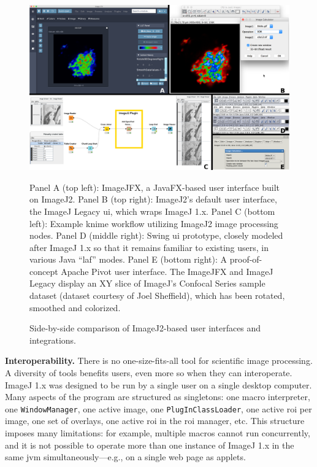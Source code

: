 \documentclass{bmcart}
\begin{document}
  \begin{figure}[h]
    \caption{Side-by-side comparison of ImageJ2-based user interfaces
    and integrations.}
    \includegraphics[width=4.75in,natwidth=2690,natheight=1708]{figure-4/figure-label.png}
    \begin{flushleft}
      \footnotesize
      Panel A (top left): ImageJFX, a JavaFX-based user interface built on
      ImageJ2. Panel B (top right): ImageJ2's default user interface, the
      ImageJ Legacy \acrshort{ui}, which wraps ImageJ 1.x. Panel C (bottom
      left): Example \acrshort{knime} workflow utilizing ImageJ2 image
      processing nodes. Panel D (middle right): Swing \acrshort{ui} prototype,
      closely modeled after ImageJ 1.x so that it remains familiar to existing
      users, in various Java ``\acrlong{laf}'' modes. Panel E (bottom right): A
      proof-of-concept Apache Pivot user interface. The ImageJFX and ImageJ
      Legacy  display an XY slice of ImageJ's Confocal Series
      sample dataset (dataset courtesy of Joel Sheffield), which has been
      rotated, smoothed and colorized.
    \end{flushleft}
  \end{figure}

\textbf{Interoperability.} There is no one-size-fits-all tool for scientific
image processing. A diversity of tools benefits users, even more so when they
can interoperate. ImageJ 1.x was designed to be run by a single user on a
single desktop computer. Many aspects of the program are structured as
singletons: one macro interpreter, one \texttt{WindowManager}, one active
image, one \texttt{PlugInClassLoader}, one active \acrshort{roi} per image, one
set of overlays, one active \acrshort{roi} in the \acrshort{roi} manager, etc.
This structure imposes many limitations: for example, multiple macros cannot
run concurrently, and it is not possible to operate more than one instance of
ImageJ 1.x in the same \acrshort{jvm} simultaneously---e.g., on a single web
page as applets.
\end{document}
